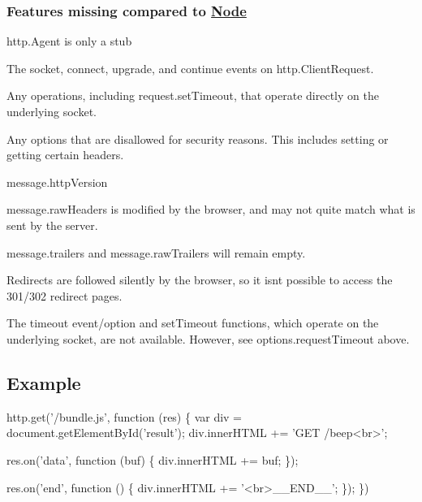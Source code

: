 \subsubsection*{Features missing compared to \mbox{\hyperlink{classNode}{Node}}}


\begin{DoxyItemize}
\item {\ttfamily http.\+Agent} is only a stub
\item The \textquotesingle{}socket\textquotesingle{}, \textquotesingle{}connect\textquotesingle{}, \textquotesingle{}upgrade\textquotesingle{}, and \textquotesingle{}continue\textquotesingle{} events on {\ttfamily http.\+Client\+Request}.
\item Any operations, including {\ttfamily request.\+set\+Timeout}, that operate directly on the underlying socket.
\item Any options that are disallowed for security reasons. This includes setting or getting certain headers.
\item {\ttfamily message.\+http\+Version}
\item {\ttfamily message.\+raw\+Headers} is modified by the browser, and may not quite match what is sent by the server.
\item {\ttfamily message.\+trailers} and {\ttfamily message.\+raw\+Trailers} will remain empty.
\item Redirects are followed silently by the browser, so it isn\textquotesingle{}t possible to access the 301/302 redirect pages.
\item The {\ttfamily timeout} event/option and {\ttfamily set\+Timeout} functions, which operate on the underlying socket, are not available. However, see {\ttfamily options.\+request\+Timeout} above.
\end{DoxyItemize}

\subsection*{Example}


\begin{DoxyCode}
http.get('/bundle.js', function (res) \{
    var div = document.getElementById('result');
    div.innerHTML += 'GET /beep<br>';

    res.on('data', function (buf) \{
        div.innerHTML += buf;
    \});

    res.on('end', function () \{
        div.innerHTML += '<br>\_\_END\_\_';
    \});
\})
\end{DoxyCode}


